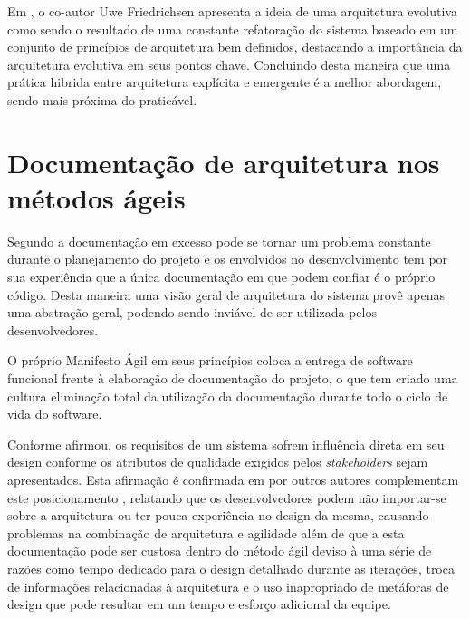 Em \cite{babar2013agile}, o co-autor Uwe Friedrichsen apresenta a ideia de uma arquitetura evolutiva como sendo o resultado de uma constante refatoração do sistema baseado em um conjunto de princípios de arquitetura bem definidos, destacando a importância da arquitetura evolutiva em seus pontos chave. Concluindo desta maneira que uma prática hibrida entre arquitetura explícita e emergente é a melhor abordagem, sendo mais próxima do praticável.



\section{Documentação de arquitetura nos métodos ágeis}

Segundo \cite{highsmith2001agile} a documentação em excesso pode se tornar um problema constante durante o planejamento do projeto e os envolvidos no desenvolvimento tem por sua experiência que a única documentação em que podem confiar é o próprio código. Desta maneira uma visão geral de arquitetura do sistema provê apenas uma abstração geral, podendo sendo inviável de ser utilizada pelos desenvolvedores.

O próprio Manifesto Ágil \cite{manifestoagil} em seus princípios coloca a entrega de software funcional frente à elaboração de documentação do projeto, o que tem criado uma cultura eliminação total da utilização da documentação durante todo o ciclo de vida do software.

Conforme \cite{bass2007software} afirmou, os requisitos de um sistema sofrem influência direta em seu design conforme os atributos de qualidade exigidos pelos \textit{stakeholders} sejam apresentados. Esta afirmação é confirmada em por outros autores complementam este posicionamento \cite{prause2012architectural}, relatando que os desenvolvedores podem não importar-se sobre a arquitetura ou ter pouca experiência no design da mesma, causando problemas na combinação de arquitetura e agilidade além de que a esta documentação pode ser custosa dentro do método ágil deviso à uma série de razões como tempo dedicado para o design detalhado durante as iterações, troca de informações relacionadas à arquitetura e o uso inapropriado de metáforas de design que pode resultar em um tempo e esforço adicional da equipe.


